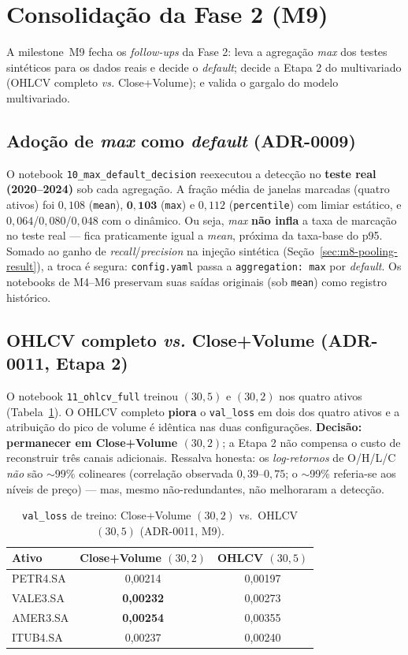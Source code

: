 \section{Consolidação da Fase 2 (M9)}
\label{sec:m9}

A milestone~M9 fecha os \emph{follow-ups} da Fase 2: leva a agregação \emph{max} dos testes
sintéticos para os dados reais e decide o \emph{default}; decide a Etapa 2 do multivariado
(OHLCV completo \emph{vs.} Close+Volume); e valida o gargalo do modelo multivariado.

\subsection{Adoção de \emph{max} como \emph{default} (ADR-0009)}
\label{sec:m9-max}
O notebook \texttt{10\_max\_default\_decision} reexecutou a detecção no \textbf{teste real
(2020--2024)} sob cada agregação. A fração média de janelas marcadas (quatro ativos) foi
$0{,}108$ (\texttt{mean}), $\mathbf{0{,}103}$ (\texttt{max}) e $0{,}112$ (\texttt{percentile})
com limiar estático, e $0{,}064$/$0{,}080$/$0{,}048$ com o dinâmico. Ou seja, \emph{max}
\textbf{não infla} a taxa de marcação no teste real --- fica praticamente igual a \emph{mean},
próxima da taxa-base do p95. Somado ao ganho de \emph{recall}/\emph{precision} na injeção
sintética (Seção~\ref{sec:m8-pooling-result}), a troca é segura: \texttt{config.yaml} passa a
\texttt{aggregation: max} por \emph{default}. Os notebooks de M4--M6 preservam suas saídas
originais (sob \texttt{mean}) como registro histórico.

\subsection{OHLCV completo \emph{vs.} Close+Volume (ADR-0011, Etapa 2)}
\label{sec:m9-ohlcv}
O notebook \texttt{11\_ohlcv\_full} treinou $(30,5)$ e $(30,2)$ nos quatro ativos
(Tabela~\ref{tab:m9-ohlcv}). O OHLCV completo \textbf{piora} o \texttt{val\_loss} em dois dos
quatro ativos e a atribuição do pico de volume é idêntica nas duas configurações. \textbf{Decisão:
permanecer em Close+Volume $(30,2)$}; a Etapa 2 não compensa o custo de reconstruir três canais
adicionais. Ressalva honesta: os \emph{log-retornos} de O/H/L/C \emph{não} são $\sim$99\%
colineares (correlação observada $0{,}39$--$0{,}75$; o $\sim$99\% referia-se aos níveis de
preço) --- mas, mesmo não-redundantes, não melhoraram a detecção.

\begin{table}[h]
\centering
\caption{\texttt{val\_loss} de treino: Close+Volume $(30,2)$ vs.\ OHLCV $(30,5)$ (ADR-0011, M9).}
\label{tab:m9-ohlcv}
\begin{tabular}{lcc}
\toprule
\textbf{Ativo} & \textbf{Close+Volume $(30,2)$} & \textbf{OHLCV $(30,5)$} \\
\midrule
PETR4.SA & 0,00214 & 0,00197 \\
VALE3.SA & \textbf{0,00232} & 0,00273 \\
AMER3.SA & \textbf{0,00254} & 0,00355 \\
ITUB4.SA & 0,00237 & 0,00240 \\
\bottomrule
\end{tabular}
\end{table}

